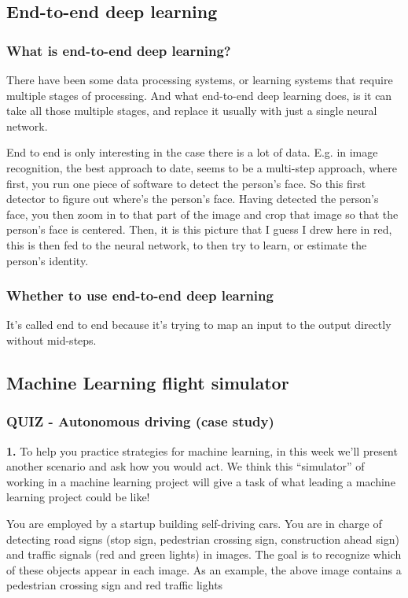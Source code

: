 \subsection{End-to-end deep learning}
\subsubsection{What is end-to-end deep learning?}
There have been some data processing systems, or learning systems that require multiple stages of processing. And what end-to-end deep learning does, is it can take all those multiple stages, and replace it usually with just a single neural network.

End to end is only interesting in the case there is a lot of data. E.g. in image recognition, the best approach to date, seems to be a multi-step approach, where first, you run one piece of software to detect the person's face. So this first detector to figure out where's the person's face. Having detected the person's face, you then zoom in to that part of the image and crop that image so that the person's face is centered. Then, it is this picture that I guess I drew here in red, this is then fed to the neural network, to then try to learn, or estimate the person's identity.
 
\subsubsection{Whether to use end-to-end deep learning}
It's called end to end because it's trying to map an input to the output directly without mid-steps.
\subsection{Machine Learning flight simulator}

\subsubsection{QUIZ - Autonomous driving (case study)}
\textbf{1.} To help you practice strategies for machine learning, in this week we’ll present another scenario and ask how you would act. We think this “simulator” of working in a machine learning project will give a task of what leading a machine learning project could be like!

You are employed by a startup building self-driving cars. You are in charge of detecting road signs (stop sign, pedestrian crossing sign, construction ahead sign) and traffic signals (red and green lights) in images. The goal is to recognize which of these objects appear in each image. As an example, the above image contains a pedestrian crossing sign and red traffic lights

